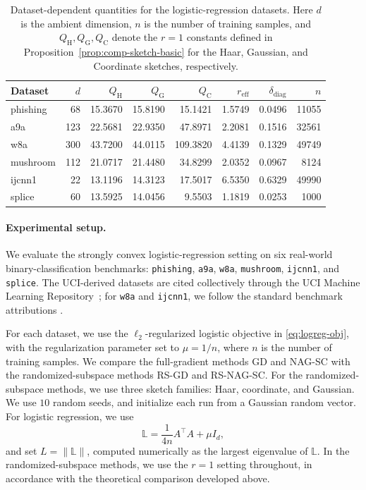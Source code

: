 \documentclass[10pt]{article}
\begin{document}
\begin{table}[t]
\centering
\caption{Dataset-dependent quantities for the logistic-regression datasets.
Here $d$ is the ambient dimension, $n$ is the number of training samples, and
$Q_{\mathrm H}, Q_{\mathrm G}, Q_{\mathrm C}$ denote the $r=1$ constants defined in Proposition~\ref{prop:comp-sketch-basic} for the Haar, Gaussian, and Coordinate sketches, respectively.}
\label{tab:logreg-q-values}
\small
\setlength{\tabcolsep}{4.5pt}
\renewcommand{\arraystretch}{1.1}
\begin{tabular}{@{}lrrrrrrr@{}}
\toprule
Dataset & $d$ & $Q_{\mathrm H}$ & $Q_{\mathrm G}$ & $Q_{\mathrm C}$ & $r_{\mathrm{eff}}$ & $\delta_{\mathrm{diag}}$ & $n$ \\
\midrule
phishing & 68  & 15.3670 & 15.8190 & 15.1421 & 1.5749 & 0.0496 & 11055 \\
a9a      & 123 & 22.5681 & 22.9350 & 47.8971 & 2.2081 & 0.1516 & 32561 \\
w8a      & 300 & 43.7200 & 44.0115 & 109.3820 & 4.4139 & 0.1329 & 49749 \\
mushroom & 112 & 21.0717 & 21.4480 & 34.8299 & 2.0352 & 0.0967 & 8124 \\
ijcnn1   & 22  & 13.1196 & 14.3123 & 17.5017 & 6.5350 & 0.6329 & 49990 \\
splice   & 60  & 13.5925 & 14.0456 & 9.5503  & 1.1819 & 0.0253 & 1000 \\
\bottomrule
\end{tabular}
\end{table}


\paragraph{Experimental setup.}
We evaluate the strongly convex logistic-regression setting on six real-world
binary-classification benchmarks:
\texttt{phishing}, \texttt{a9a}, \texttt{w8a},
\texttt{mushroom}, \texttt{ijcnn1}, and \texttt{splice}.
The UCI-derived datasets are cited collectively through the UCI Machine
Learning Repository~\citep{uci_repository}; for \texttt{w8a} and
\texttt{ijcnn1}, we follow the standard benchmark attributions
\citep{platt1998smo,prokhorov2001ijcnn}.


For each dataset, we use the $\ell_2$-regularized logistic objective in \eqref{eq:logreg-obj}, with the regularization parameter set to $\mu=1/n$, where $n$ is the number of training samples.
We compare the full-gradient methods GD and NAG-SC with the randomized-subspace methods RS-GD and RS-NAG-SC.
For the randomized-subspace methods, we use three sketch families: Haar, coordinate, and Gaussian.
We use $10$ random seeds, and initialize each run from a Gaussian random vector.
For logistic regression, we use
\[
\mathbb{L}=\frac{1}{4n}A^\top A+\mu I_d,
\]
and set $L=\|\mathbb{L}\|$, computed numerically as the largest eigenvalue of $\mathbb{L}$.
In the randomized-subspace methods, we use the $r=1$ setting throughout, in accordance with the theoretical comparison developed above.
\end{document}

